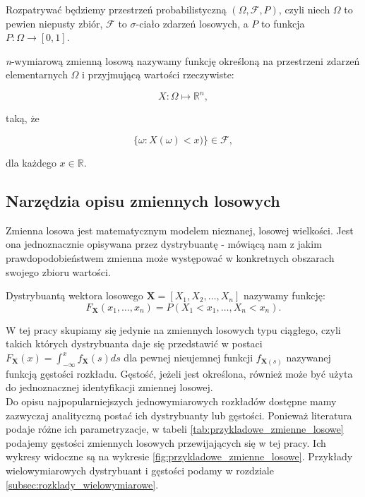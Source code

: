 Rozpatrywać będziemy przestrzeń probabilistyczną $(\Omega,\mathcal{F},P)$, czyli niech $\Omega$ to pewien niepusty zbiór, $\mathcal{F}$ to $\sigma$-ciało zdarzeń losowych, a $P$ to funkcja $P\colon\Omega\rightarrow[0,1]$. 

\begin{df}\cite{Rachunek_prob}
	\label{df:n_wym_zmienna_losowa}
	\textit{n}-wymiarową zmienną losową nazywamy funkcję określoną na przestrzeni zdarzeń elementarnych $\Omega$ i przyjmującą wartości rzeczywiste:
	
	$$ X\colon \Omega \mapsto \mathbb{R}^{n}, $$

	taką, że
	
	$$ \{ \omega \colon X(\omega) < x) \} \in \mathcal{F},$$
	
	dla każdego $x \in \mathbb{R}.$
\end{df}


\subsection{Narzędzia opisu zmiennych losowych}
Zmienna losowa jest matematycznym modelem nieznanej, losowej wielkości. Jest ona jednoznacznie opisywana przez dystrybuantę - mówiącą nam z jakim prawdopodobieństwem zmienna może występować w konkretnych obszarach swojego zbioru wartości.

\begin{df}[Dystrybuanta]\cite{Rachunek_prob}
	Dystrybuantą wektora losowego $\mathbf{X} = [X_1, X_2, \dots, X_n]$ nazywamy funkcję:
	$$
	F_{\mathbf{X}}(x_1, \dots, x_n)=P(X_1 < x_1, \dots, X_n < x_n).
	$$
\end{df}

W tej pracy skupiamy się jedynie na zmiennych losowych typu ciągłego, czyli takich których dystrybuanta daje się przedstawić w postaci $ F_{\mathbf{X}}(x) =\int_{-\infty}^{x}f_{\mathbf{X}}(s) ds$ dla pewnej nieujemnej funkcji $f_{\mathbf{X}(s)}$ nazywanej funkcją gęstości rozkładu. Gęstość, jeżeli jest określona, również może być użyta do jednoznacznej identyfikacji zmiennej losowej.\\

Do opisu najpopularniejszych jednowymiarowych rozkładów dostępne mamy zazwyczaj analityczną postać ich dystrybuanty lub gęstości. Ponieważ literatura podaje różne ich parametryzacje, w tabeli \ref{tab:przykladowe_zmienne_losowe} podajemy gęstości zmiennych losowych przewijających się w tej pracy. Ich wykresy widoczne są na wykresie \ref{fig:przykladowe_zmienne_losowe}. Przykłady wielowymiarowych dystrybuant i gęstości podamy w rozdziale \ref{subsec:rozklady_wielowymiarowe}. 

